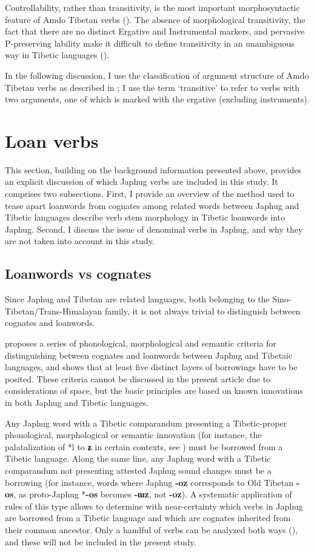 \documentclass[oneside,a4paper,11pt]{article}
\newcommand{\ipa}[1]{{\phon\textbf{\mbox{#1}}}} %
\begin{document}
Controllability, rather than transitivity, is the most important morphosyntactic feature of Amdo Tibetan verbs (\citealt[74-75, 136]{haller04themchen}). The absence of morphological transitivity, the fact that there are no distinct Ergative and Instrumental markers, and pervasive P-preserving lability make it difficult to define transitivity in an unambiguous way in Tibetic languages (\citealt{tournadre96erg}).

In the following discussion, I use the classification of argument structure of Amdo Tibetan verbs as described in \citet{haller04themchen}; I use the term `transitive' to refer to verbs with two arguments, one of which is marked with the ergative (excluding instruments). 


\section{Loan verbs}
This section, building on the background information presented above, provides an explicit discussion of which Japhug verbs are included in this study. It comprises two subsections. First, I provide an overview of the method used to tease apart loanwords from cognates among related words between Japhug and Tibetic languages describe verb stem morphology in Tibetic loanwords into Japhug. Second, I discuss the issue of denominal verbs in Japhug, and why they are not taken into account in this study. 

\subsection{Loanwords vs cognates} \label{sec:layers}
Since Japhug and Tibetan are related languages, both belonging to the Sino-Tibetan/Trans-Himalayan family, it is not always trivial to distinguish between cognates and loanwords. 

\citet[83-200]{jacques04these} proposes a series of phonological, morphological and semantic criteria for distinguishing between cognates and  loanwords between Japhug and Tibetaic languages, and shows that at least five distinct layers of borrowings have to be posited. These criteria cannot be discussed in the present article due to considerations of space, but the basic principles are based on known innovations in both Japhug and Tibetic languages. 

Any Japhug word with a Tibetic comparandum presenting a Tibetic-proper phonological, morphological or semantic innovation (for instance, the palatalization of *l to \ipa{ʑ} in certain contexts, see \citealt{hill13laterals}) must be borrowed from a Tibetic language. Along the same line, any Japhug word with a Tibetic comparandum not presenting attested Japhug sound changes must be a borrowing (for instance, words where Japhug \ipa{-oz} corresponds to Old Tibetan \ipa{-os}, as proto-Japhug *\ipa{-os} becomes \ipa{-ɯz}, not \ipa{-oz}). A systematic application of rules of this type allows to determine with near-certainty which verbs in Japhug are borrowed from a Tibetic language and which are cognates inherited from their common ancestor. Only a handful of verbs can be analyzed both ways (\citealt[164]{jacques04these}), and these will not be included in the present study. 
\end{document}
